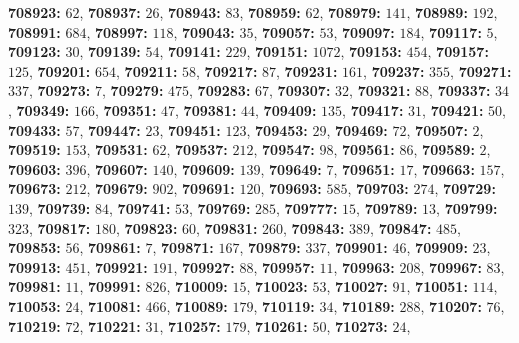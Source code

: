 \textsf{\bfseries 708923:} $62$, \textsf{\bfseries 708937:} $26$, \textsf{\bfseries 708943:} $83$, \textsf{\bfseries 708959:} $62$, \textsf{\bfseries 708979:} $141$, \textsf{\bfseries 708989:} $192$, \textsf{\bfseries 708991:} $684$, \textsf{\bfseries 708997:} $118$, \textsf{\bfseries 709043:} $35$, \textsf{\bfseries 709057:} $53$, \textsf{\bfseries 709097:} $184$, \textsf{\bfseries 709117:} $5$, \textsf{\bfseries 709123:} $30$, \textsf{\bfseries 709139:} $54$, \textsf{\bfseries 709141:} $229$, \textsf{\bfseries 709151:} $1072$, \textsf{\bfseries 709153:} $454$, \textsf{\bfseries 709157:} $125$, \textsf{\bfseries 709201:} $654$, \textsf{\bfseries 709211:} $58$, \textsf{\bfseries 709217:} $87$, \textsf{\bfseries 709231:} $161$, \textsf{\bfseries 709237:} $355$, \textsf{\bfseries 709271:} $337$, \textsf{\bfseries 709273:} $7$, \textsf{\bfseries 709279:} $475$, \textsf{\bfseries 709283:} $67$, \textsf{\bfseries 709307:} $32$, \textsf{\bfseries 709321:} $88$, \textsf{\bfseries 709337:} $34$, \textsf{\bfseries 709349:} $166$, \textsf{\bfseries 709351:} $47$, \textsf{\bfseries 709381:} $44$, \textsf{\bfseries 709409:} $135$, \textsf{\bfseries 709417:} $31$, \textsf{\bfseries 709421:} $50$, \textsf{\bfseries 709433:} $57$, \textsf{\bfseries 709447:} $23$, \textsf{\bfseries 709451:} $123$, \textsf{\bfseries 709453:} $29$, \textsf{\bfseries 709469:} $72$, \textsf{\bfseries 709507:} $2$, \textsf{\bfseries 709519:} $153$, \textsf{\bfseries 709531:} $62$, \textsf{\bfseries 709537:} $212$, \textsf{\bfseries 709547:} $98$, \textsf{\bfseries 709561:} $86$, \textsf{\bfseries 709589:} $2$, \textsf{\bfseries 709603:} $396$, \textsf{\bfseries 709607:} $140$, \textsf{\bfseries 709609:} $139$, \textsf{\bfseries 709649:} $7$, \textsf{\bfseries 709651:} $17$, \textsf{\bfseries 709663:} $157$, \textsf{\bfseries 709673:} $212$, \textsf{\bfseries 709679:} $902$, \textsf{\bfseries 709691:} $120$, \textsf{\bfseries 709693:} $585$, \textsf{\bfseries 709703:} $274$, \textsf{\bfseries 709729:} $139$, \textsf{\bfseries 709739:} $84$, \textsf{\bfseries 709741:} $53$, \textsf{\bfseries 709769:} $285$, \textsf{\bfseries 709777:} $15$, \textsf{\bfseries 709789:} $13$, \textsf{\bfseries 709799:} $323$, \textsf{\bfseries 709817:} $180$, \textsf{\bfseries 709823:} $60$, \textsf{\bfseries 709831:} $260$, \textsf{\bfseries 709843:} $389$, \textsf{\bfseries 709847:} $485$, \textsf{\bfseries 709853:} $56$, \textsf{\bfseries 709861:} $7$, \textsf{\bfseries 709871:} $167$, \textsf{\bfseries 709879:} $337$, \textsf{\bfseries 709901:} $46$, \textsf{\bfseries 709909:} $23$, \textsf{\bfseries 709913:} $451$, \textsf{\bfseries 709921:} $191$, \textsf{\bfseries 709927:} $88$, \textsf{\bfseries 709957:} $11$, \textsf{\bfseries 709963:} $208$, \textsf{\bfseries 709967:} $83$, \textsf{\bfseries 709981:} $11$, \textsf{\bfseries 709991:} $826$, \textsf{\bfseries 710009:} $15$, \textsf{\bfseries 710023:} $53$, \textsf{\bfseries 710027:} $91$, \textsf{\bfseries 710051:} $114$, \textsf{\bfseries 710053:} $24$, \textsf{\bfseries 710081:} $466$, \textsf{\bfseries 710089:} $179$, \textsf{\bfseries 710119:} $34$, \textsf{\bfseries 710189:} $288$, \textsf{\bfseries 710207:} $76$, \textsf{\bfseries 710219:} $72$, \textsf{\bfseries 710221:} $31$, \textsf{\bfseries 710257:} $179$, \textsf{\bfseries 710261:} $50$, \textsf{\bfseries 710273:} $24$, 
